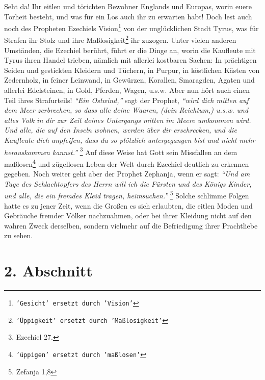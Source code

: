 Seht da! Ihr eitlen und törichten Bewohner Englands und Europas, worin euere
Torheit besteht, und was für ein Los auch ihr zu erwarten habt! Doch lest
auch noch des Propheten Ezechiels Vision\footnote{\texttt{'Gesicht' ersetzt durch 'Vision'}} von der unglücklichen Stadt Tyrus, was
für Strafen ihr Stolz und ihre Maßlosigkeit\footnote{\texttt{'Üppigkeit' ersetzt durch 'Maßlosigkeit'}} ihr zuzogen. Unter vielen anderen
Umständen, die Ezechiel berührt, führt er die Dinge an, worin die Kaufleute mit
Tyrus ihren Handel trieben, nämlich mit allerlei kostbaren Sachen: In prächtigen
Seiden und gestickten Kleidern und Tüchern, in Purpur, in köstlichen Kästen von
Zedernholz, in feiner Leinwand, in Gewürzen, Korallen, Smaragden, Agaten und
allerlei Edelsteinen, in Gold, Pferden, Wagen, u.s.w. Aber nun hört auch einen
Teil ihres Strafurteils! \textit{"`Ein Ostwind,"'} sagt der Prophet,
\textit{"`wird dich mitten
auf dem Meer zerbrechen, so dass alle deine Waaren, (dein Reichtum,) u.s.w.
und alles Volk in dir zur Zeit deines Untergangs mitten im Meere umkommen wird.
Und alle, die auf den Inseln wohnen, werden über dir erschrecken, und die
Kaufleute dich anpfeifen, dass du so plötzlich untergegangen bist und nicht mehr
herauskommen kannst."'}
\footnote{Ezechiel 27.}
Auf diese Weise hat Gott sein Missfallen
an dem maßlosen\footnote{\texttt{'üppigen' ersetzt durch 'maßlosen'}} und zügellosen Leben der Welt durch Ezechiel deutlich zu erkennen
gegeben. Noch weiter geht aber der Prophet Zephanja, wenn er sagt:
\textit{"`Und am Tage
des Schlachtopfers des Herrn will ich  die Fürsten und des Königs
Kinder, und alle, die ein fremdes Kleid tragen, heimsuchen."'}
\footnote{Zefanja 1,8}
Solche
schlimme Folgen hatte es zu jener Zeit, wenn die Großen es sich erlaubten, die
eitlen Moden und Gebräuche fremder Völker nachzuahmen, oder bei ihrer Kleidung
nicht auf den wahren Zweck derselben, sondern vielmehr auf die Befriedigung
ihrer Prachtliebe zu sehen.

\section{2. Abschnitt} \label{kap15_ab2}

